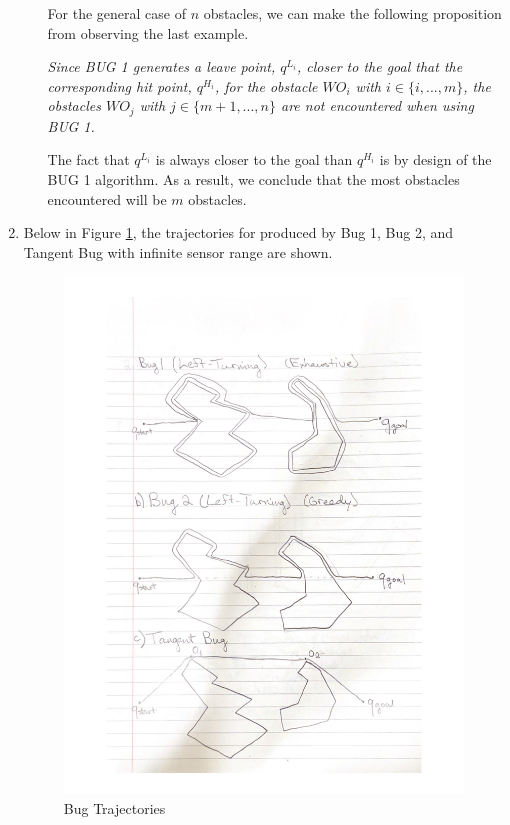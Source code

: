 \documentclass[11pt]{article}
\begin{document}
\begin{enumerate}[leftmargin=0.3in]
\begin{enumerate}
   For the general case of $n$ obstacles, we can make the following proposition from observing the last example. \break 

   \textit{Since BUG 1 generates a leave point, $q^{L_i}$, closer to the goal that the corresponding hit point, $q^{H_i}$, for the obstacle $WO_i$ with $i \in \{i,...,m\}$, the obstacles $WO_j$ with $j \in \{m+1,...,n\}$ are not encountered when using BUG 1.} \break

   The fact that $q^{L_i}$ is always closer to the goal than $q^{H_i}$ is by design of the BUG 1 algorithm. As a result, we conclude that the most obstacles encountered will be $m$ obstacles.

  \end{enumerate} %

  \item %
  \begin{enumerate}
    Below in Figure \ref{fig:2}, the trajectories for produced by Bug 1, Bug 2, and Tangent Bug with infinite sensor range are shown.
   
   \begin{figure}[H]
      \centering
      \includegraphics[width=11cm]{figures/problem2.png}
      \caption{Bug Trajectories}
      \label{fig:2}
   \end{figure}
    

\end{enumerate}
\end{enumerate}
\end{document}
